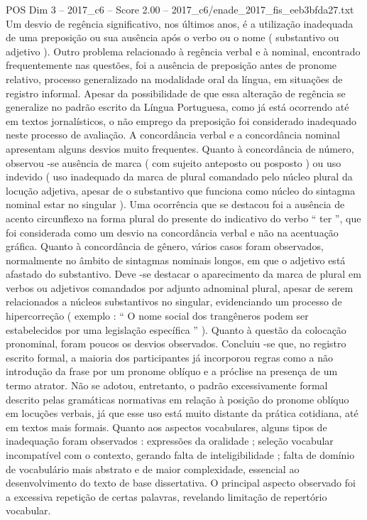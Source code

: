 \begin{textsample}{POS Dim 3 – 2017\_c6 – Score 2.00 – 2017\_c6/enade\_2017\_fis\_eeb3bfda27.txt}
Um desvio de regência significativo, nos últimos anos, é a utilização inadequada de uma preposição ou sua ausência após o verbo ou o nome ( substantivo ou adjetivo ).
Outro problema relacionado à regência verbal e à nominal, encontrado frequentemente nas questões, foi a ausência de preposição antes de pronome relativo, processo generalizado na modalidade oral da língua, em situações de registro informal.
Apesar da possibilidade de que essa alteração de regência se generalize no padrão escrito da Língua Portuguesa, como já está ocorrendo até em textos jornalísticos, o não emprego da preposição foi considerado inadequado neste processo de avaliação.
A concordância verbal e a concordância nominal apresentam alguns desvios muito frequentes.
Quanto à concordância de número, observou -se ausência de marca ( com sujeito anteposto ou posposto ) ou uso indevido ( uso inadequado da marca de plural comandado pelo núcleo plural da locução adjetiva, apesar de o substantivo que funciona como núcleo do sintagma nominal estar no singular ).
Uma ocorrência que se destacou foi a ausência de acento circunflexo na forma plural do presente do indicativo do verbo “ ter ”, que foi considerada como um desvio na concordância verbal e não na acentuação gráfica.
Quanto à concordância de gênero, vários casos foram observados, normalmente no âmbito de sintagmas nominais longos, em que o adjetivo está afastado do substantivo.
Deve -se destacar o aparecimento da marca de plural em verbos ou adjetivos comandados por adjunto adnominal plural, apesar de serem relacionados a núcleos substantivos no singular, evidenciando um processo de hipercorreção ( exemplo : “ O nome social dos trangêneros podem ser estabelecidos por uma legislação específica ” ).
Quanto à questão da colocação pronominal, foram poucos os desvios observados.
Concluiu -se que, no registro escrito formal, a maioria dos participantes já incorporou regras como a não introdução da frase por um pronome oblíquo e a próclise na presença de um termo atrator.
Não se adotou, entretanto, o padrão excessivamente formal descrito pelas gramáticas normativas em relação à posição do pronome oblíquo em locuções verbais, já que esse uso está muito distante da prática cotidiana, até em textos mais formais.
Quanto aos aspectos vocabulares, alguns tipos de inadequação foram observados : expressões da oralidade ; seleção vocabular incompatível com o contexto, gerando falta de inteligibilidade ; falta de domínio de vocabulário mais abstrato e de maior complexidade, essencial ao desenvolvimento do texto de base dissertativa.
O principal aspecto observado foi a excessiva repetição de certas palavras, revelando limitação de repertório vocabular.

\end{textsample}
